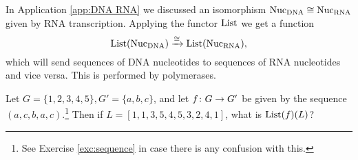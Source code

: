 \begin{application}\label{app:polymerase}
In Application \ref{app:DNA RNA} we discussed an isomorphism $\textnormal{Nuc}_\textnormal{DNA}\cong\textnormal{Nuc}_\textnormal{RNA}$ given by RNA transcription. Applying the functor $\textnormal{List}$ we get a function $$\textnormal{List}(\textnormal{Nuc}_\textnormal{DNA})\xrightarrow{\cong}\textnormal{List}(\textnormal{Nuc}_\textnormal{RNA}),$$ which will send sequences of DNA nucleotides to sequences of RNA nucleotides and vice versa. This is performed by polymerases.

\end{application}

\begin{exercise}\label{exc:list as functor}
Let $G=\{1,2,3,4,5\}, G'=\{a,b,c\}$, and let $f\colon G\rightarrow G'$ be given by the sequence $(a,c,b,a,c)$.\footnote{See Exercise \ref{exc:sequence} in case there is any confusion with this.} Then if $L=[1,1,3,5,4,5,3,2,4,1]$, what is $\textnormal{List}(f)(L)$?
\end{exercise}

